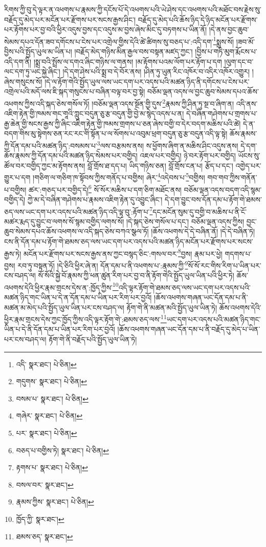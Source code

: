 རིགས་ཀྱི་བུ་དེ་ལྟར་ན་འཕགས་པ་རྣམས་ཀྱི་དངོས་པོ་དེ་འཕགས་པའི་ཡེ་ཤེས་དང་འཕགས་པའི་མཐོང་བས་རྗེས་སུ་བརྗོད་དུ་མེད་པར་མངོན་པར་རྫོགས་པར་སངས་རྒྱས་ཤིང་། བརྗོད་དུ་མེད་པའི་ཆོས་ཉིད་དེ་ཉིད་མངོན་པར་རྫོགས་པར་རྟོགས་པར་བྱ་བའི་ཕྱིར་འདུས་བྱས་དང་འདུས་མ་བྱས་ཞེས་མིང་དུ་བཏགས་པ་ཡིན་ནོ། །དེ་ནས་བྱང་ཆུབ་སེམས་དཔའ་དོན་ཟབ་དགོངས་པ་ངེས་པར་འགྲེལ་གྱིས་དེའི་ཚེ་ཚིགས་སུ་བཅད་པ་:འདི་དག་\footnote{འདི་  སྣར་ཐང་།  པེ་ཅིན། }སྨྲས་སོ། །ཟབ་མོ་བྱིས་པའི་སྤྱོད་ཡུལ་མ་ཡིན་པ། །བརྗོད་མེད་གཉིས་མིན་རྒྱལ་བས་བསྟན་མཛད་ཀྱང་། །བྱིས་པ་གཏི་མུག་རྨོངས་པ་འདི་དག་ནི། །སྨྲ་བའི་སྤྲོས་ལ་དགའ་ཞིང་གཉིས་ལ་གནས། །མ་རྟོགས་པའམ་ལོག་པར་རྟོག་པ་དག །ལུག་དང་བ་ལང་དག་ཏུ་ཡང་སྐྱེ་ཞིང་། །དེ་དག་ཤེས་པའི་སྨྲ་བ་དེ་བོར་ནས། །ཤིན་ཏུ་ཡུན་རིང་འཁོར་བ་འདིར་འཁོར་འགྱུར། །ཞེས་གསུངས་སོ། །དེ་ལ་རྟོག་གེའི་སྤྱོད་ཡུལ་ལས་ཡང་དག་པར་འདས་པའི་མཚན་ཉིད་ནི་དགོངས་པ་ངེས་པར་འགྲེལ་པའི་མདོ་ལས་ཇི་སྐད་གསུངས་པ་བཞིན་བལྟ་བར་བྱ་སྟེ། བཅོམ་ལྡན་འདས་ལ་བྱང་ཆུབ་སེམས་དཔའ་ཆོས་འཕགས་ཀྱིས་འདི་སྐད་ཅེས་གསོལ་ཏོ། །བཅོམ་ལྡན་འདས་སྔོན་གྱི་དུས་\footnote{གདུགས་  སྣར་ཐང་།  པེ་ཅིན། }རྣམས་ཀྱི་ཤིན་ཏུ་སྔ་བ་ཞིག་ན། འདི་ནས་འཇིག་རྟེན་གྱི་ཁམས་གང་གཱའི་ཀླུང་བདུན་ཅུ་རྩ་བདུན་གྱི་བྱེ་མ་སྙེད་འདས་པ་ན། དེ་བཞིན་གཤེགས་པ་གྲགས་པ་རྒྱ་ཆེན་གྱི་སངས་རྒྱས་ཀྱི་ཞིང་འཇིག་རྟེན་གྱི་ཁམས་གྲགས་པ་ཅན་ཞེས་བགྱི་བ་དེར་བདག་མཆིས་པའི་ཚེ། དེ་ན་བདག་གིས་མུ་སྟེགས་ཅན་རང་རང་གི་སྟོན་པ་ལ་སོགས་པ་འབུམ་ཕྲག་བདུན་ཅུ་རྩ་བདུན་འདི་ལྟ་སྟེ། ཆོས་རྣམས་ཀྱི་དོན་དམ་པའི་མཚན་ཉིད་:བསམས་པ་\footnote{བསམ་པ་  སྣར་ཐང་།  པེ་ཅིན། }ལས་བརྩམས་ནས། ས་ཕྱོགས་ཞིག་ན་མཆིས་ཤིང་འདུས་ནས། དེ་དག་ཆོས་རྣམས་ཀྱི་དོན་དམ་པའི་མཚན་ཉིད་སེམས་པར་བགྱིད། འཇལ་པར་བགྱིད། ཉེ་བར་རྟོག་པར་བགྱིད། ཡོངས་སུ་ཚོལ་བར་བགྱིད་ཀྱང་མ་རྟོགས་ནས། བློ་གྲོས་ཐ་དད་པ། ཡིད་གཉིས་ཅན། བློ་གྲོས་ངན་པ། རྩོད་པ་དང་། འགྱེད་པར་གྱུར་པ་དག །གཅིག་ལ་གཅིག་ཁ་སྟོབས་ཀྱིས་གནོད་པ་བགྱིས། ཞེར་\footnote{གཞེར་  སྣར་ཐང་།  པེ་ཅིན། }འདེབས་པ་\footnote{པར་  སྣར་ཐང་།  པེ་ཅིན། }བགྱིས། གབ་གབ་ཀྱིས་གནོན་པ་བགྱིས། ཚར་:གཅད་པར་བགྱིད་དེ།\footnote{བཅད་པ་བགྱིས་ཏེ།  སྣར་ཐང་།  པེ་ཅིན། } སོ་སོར་མཆིས་པ་དག་ཅིག་མཐོང་ནས། བཅོམ་ལྡན་འདས་བདག་འདི་སྙམ་བགྱིད་དེ། ཀྱེ་མ་དེ་བཞིན་གཤེགས་པ་རྣམས་འཇིག་རྟེན་དུ་འབྱུང་ཞིང་། དེ་དག་བྱུང་བས་དོན་དམ་པ་རྟོག་གེ་ཐམས་ཅད་ལས་ཡང་དག་པར་འདས་པའི་མཚན་ཉིད་འདི་ལྟ་བུ་:རྟོག་པ་\footnote{རྟགས་པ་  སྣར་ཐང་།  པེ་ཅིན། }དང་མངོན་སུམ་དུ་བགྱི་བ་མཆིས་པ་ནི་ངོ་མཚར་རྨད་དུ་བྱུང་བ་ལགས་སོ་སྙམ་བགྱིད་ལགས་སོ། །དེ་སྐད་ཅེས་གསོལ་པ་དང་། བཅོམ་ལྡན་འདས་ཀྱིས། བྱང་ཆུབ་སེམས་དཔའ་ཆོས་འཕགས་ལ་འདི་སྐད་ཅེས་བཀའ་སྩལ་ཏོ། །ཆོས་འཕགས་དེ་དེ་བཞིན་ནོ། །དེ་དེ་བཞིན་ཏེ། ངས་ནི་དོན་དམ་པ་རྟོག་གེ་ཐམས་ཅད་ལས་ཡང་དག་པར་འདས་པའི་མཚན་ཉིད་མངོན་པར་རྫོགས་པར་སངས་རྒྱས་ཏེ། མངོན་པར་རྫོགས་པར་སངས་རྒྱས་ནས་ཀྱང་བསྙད་ཅིང་:གསལ་བར་\footnote{བསལ་བར་  སྣར་ཐང་། }བྱས། རྣམ་པར་ཕྱེ། གདགས་པ་བྱས། རབ་ཏུ་བསྟན་ཏོ། །དེ་ཅིའི་ཕྱིར་ཞེ་ན། དོན་དམ་པ་ནི་འཕགས་པ་:རྣམས་ཀྱི་\footnote{རྣམས་ཀྱིས་  སྣར་ཐང་།  པེ་ཅིན། }སོ་སོ་རང་གིས་རིག་པ་ཡིན་པར་ངས་བཤད་ལ། སོ་སོའི་སྐྱེ་བོ་རྣམས་ཀྱི་ཕན་ཚུན་རིག་པར་བྱ་བ་ནི་རྟོག་གེའི་སྤྱོད་ཡུལ་ཡིན་པའི་ཕྱིར་ཏེ། ཆོས་འཕགས་དེའི་ཕྱིར་རྣམ་གྲངས་དེས་ན་:ཁྱོད་ཀྱིས་\footnote{ཁྱོད་ཀྱི་  སྣར་ཐང་། }འདི་ལྟར་རྟོག་གེ་ཐམས་ཅད་ལས་ཡང་དག་པར་འདས་པའི་མཚན་ཉིད་གང་ཡིན་པ་དེ་ན་དོན་དམ་པ་ཡིན་པར་རིག་པར་བྱའོ། །ཆོས་འཕགས་གཞན་ཡང་དོན་དམ་པ་ནི་མཚན་མ་མེད་པའི་སྤྱོད་ཡུལ་ཡིན་པར་ངས་བཤད་ལ། རྟོག་གེ་ནི་མཚན་མའི་སྤྱོད་ཡུལ་ཡིན་ཏེ། ཆོས་འཕགས་དེའི་ཕྱིར་རྣམ་གྲངས་དེས་ཀྱང་ཁྱོད་ཀྱིས་འདི་ལྟར་རྟོག་གེ་:ཐམས་ཅད་ལས་\footnote{ཐམས་ཅད་  སྣར་ཐང་། }ཡང་དག་པར་འདས་པའི་མཚན་ཉིད་གང་ཡིན་པ་དེ་ནི་དོན་དམ་པ་ཡིན་པར་རིག་པར་བྱའོ། །ཆོས་འཕགས་གཞན་ཡང་དོན་དམ་པ་ནི་བརྗོད་དུ་མེད་པ་ཡིན་པར་ངས་བཤད་ལ། རྟོག་གེ་ནི་བརྗོད་པའི་སྤྱོད་ཡུལ་ཡིན་ཏེ། 